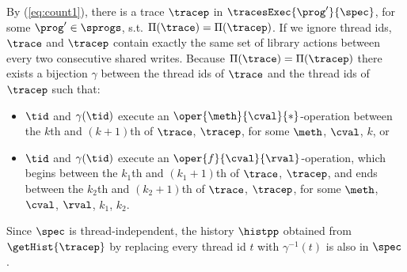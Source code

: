 By (\ref{eq:count1}), there is a trace $\tracep$ in $\tracesExec{\prog'}{\spec}$, for some $\prog'\in\sprogs$, s.t. 
$\Pi(\trace)=\Pi(\tracep)$.
If we ignore thread ids, $\trace$ and $\tracep$ contain exactly the same set of library actions
between every two consecutive shared writes. Because $\Pi(\trace)=\Pi(\tracep)$ there exists 
a bijection $\gamma$ between the thread ids of $\trace$ and the thread ids of $\tracep$ such that:
\begin{itemize}
	\item $\tid$ and $\gamma(\tid)$ execute an $\oper{\meth}{\cval}{*}$-operation between the $k$th and $(k+1)$th {\shwrite} of $\trace$, \resp $\tracep$, 
	for some $\meth$, $\cval$, $k$, 
	or
	\item $\tid$ and $\gamma(\tid)$ execute an $\oper{f}{\cval}{\rval}$-operation, which begins between the $k_1$th and $(k_1+1)$th {\shwrite} of $\trace$, \resp $\tracep$, and ends between the $k_2$th and $(k_2+1)$th {\shwrite} of $\trace$, \resp $\tracep$, for some $\meth$, $\cval$, $\rval$, $k_1$, $k_2$.
\end{itemize}

Since $\spec$ is thread-independent, the history $\histpp$ obtained from $\getHist{\tracep}$ by replacing every thread id $t$ with $\gamma^{-1}(t)$ is also in $\spec$.

